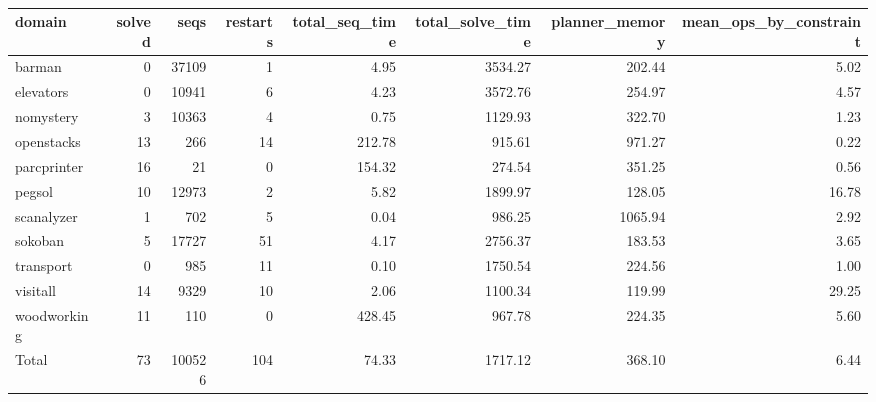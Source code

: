 \begin{table*}[htbp]
\centering
\begingroup\small
\begin{tabular}{lrrrrrrr}
  \hline
domain & solved & seqs & restarts & total\_seq\_time & total\_solve\_time & planner\_memory & mean\_ops\_by\_constraint \\ 
  \hline
barman &   0 & 37109 &   1 & 4.95 & 3534.27 & 202.44 & 5.02 \\ 
  elevators &   0 & 10941 &   6 & 4.23 & 3572.76 & 254.97 & 4.57 \\ 
  nomystery &   3 & 10363 &   4 & 0.75 & 1129.93 & 322.70 & 1.23 \\ 
  openstacks &  13 & 266 &  14 & 212.78 & 915.61 & 971.27 & 0.22 \\ 
  parcprinter &  16 &  21 &   0 & 154.32 & 274.54 & 351.25 & 0.56 \\ 
  pegsol &  10 & 12973 &   2 & 5.82 & 1899.97 & 128.05 & 16.78 \\ 
  scanalyzer &   1 & 702 &   5 & 0.04 & 986.25 & 1065.94 & 2.92 \\ 
  sokoban &   5 & 17727 &  51 & 4.17 & 2756.37 & 183.53 & 3.65 \\ 
  transport &   0 & 985 &  11 & 0.10 & 1750.54 & 224.56 & 1.00 \\ 
  visitall &  14 & 9329 &  10 & 2.06 & 1100.34 & 119.99 & 29.25 \\ 
  woodworking &  11 & 110 &   0 & 428.45 & 967.78 & 224.35 & 5.60 \\ 
  Total &  73 & 100526 & 104 & 74.33 & 1717.12 & 368.10 & 6.44 \\ 
   \hline
\end{tabular}
\endgroup
\caption{\oursolver{}} 
\label{tab:our}
\end{table*}
